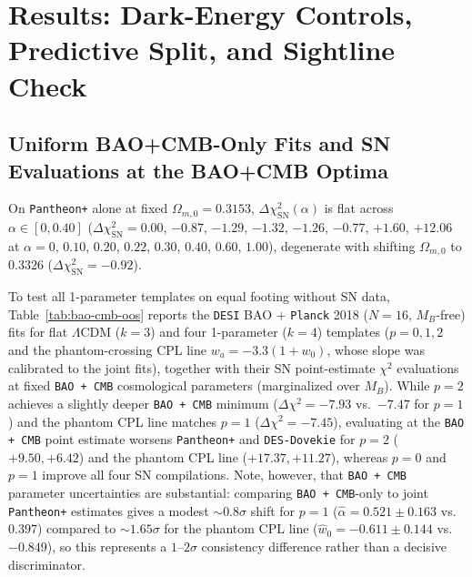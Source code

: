 \documentclass[11pt,a4paper]{article}
\begin{document}
\section{Results: Dark-Energy Controls, Predictive Split, and Sightline Check}
\label{sec:results}
\subsection{Uniform BAO+CMB-Only Fits and SN Evaluations at the BAO+CMB Optima}
On \texttt{Pantheon+} alone at fixed $\Omega_{m,0} = 0.3153$, $\Delta\chi^2_{\mathrm{SN}}(\alpha)$ is flat across $\alpha \in [0, 0.40]$ ($\Delta\chi^2_{\mathrm{SN}} = 0.00$, $-0.87$, $-1.29$, $-1.32$, $-1.26$, $-0.77$, $+1.60$, $+12.06$ at $\alpha = 0$, $0.10$, $0.20$, $0.22$, $0.30$, $0.40$, $0.60$, $1.00$), degenerate with shifting $\Omega_{m,0}$ to $0.3326$ ($\Delta\chi^2_{\mathrm{SN}} = -0.92$).

To test all 1-parameter templates on equal footing without SN data, Table~\ref{tab:bao-cmb-oos} reports the \texttt{DESI} BAO + \texttt{Planck} 2018 ($N = 16$, $M_B$-free) fits for flat $\Lambda$CDM ($k = 3$) and four 1-parameter ($k = 4$) templates ($p = 0, 1, 2$ and the phantom-crossing CPL line $w_a = -3.3(1+w_0)$, whose slope was calibrated to the joint fits), together with their SN point-estimate $\chi^2$ evaluations at fixed \texttt{BAO + CMB} cosmological parameters (marginalized over $M_B$). While $p = 2$ achieves a slightly deeper \texttt{BAO + CMB} minimum ($\Delta\chi^2 = -7.93$ vs.\ $-7.47$ for $p = 1$) and the phantom CPL line matches $p = 1$ ($\Delta\chi^2 = -7.45$), evaluating at the \texttt{BAO + CMB} point estimate worsens \texttt{Pantheon+} and \texttt{DES-Dovekie} for $p = 2$ ($+9.50, +6.42$) and the phantom CPL line ($+17.37, +11.27$), whereas $p = 0$ and $p = 1$ improve all four SN compilations. Note, however, that \texttt{BAO + CMB} parameter uncertainties are substantial: comparing \texttt{BAO + CMB}-only to joint \texttt{Pantheon+} estimates gives a modest $\sim 0.8\sigma$ shift for $p = 1$ ($\hat{\alpha} = 0.521 \pm 0.163$ vs.\ $0.397$) compared to $\sim 1.65\sigma$ for the phantom CPL line ($\hat{w}_0 = -0.611 \pm 0.144$ vs.\ $-0.849$), so this represents a $1\text{--}2\sigma$ consistency difference rather than a decisive discriminator.
\end{document}
